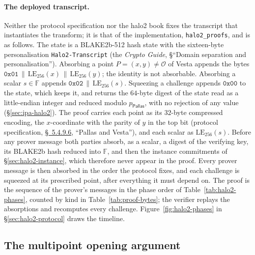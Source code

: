 \documentclass[11pt,a4paper]{article}
\theoremstyle{definition}
\newcommand{\F}{\mathbb{F}}
\newcommand{\Pallas}{\ensuremath{\mathsf{Pallas}}}
\begin{document}
\paragraph{The deployed transcript.}
Neither the protocol specification nor the halo2 book fixes the
transcript that instantiates the transform; it is that of the
implementation, \texttt{halo2\_proofs}, and is as follows. The state is
a BLAKE2b-512 hash state with the sixteen-byte personalisation
\texttt{Halo2-Transcript} (the \emph{Crypto Guide}, \S``Domain
separation and personalisation''). Absorbing a point
$P = (x, y) \ne \mathcal O$ of Vesta appends the bytes
$\mathtt{0x01} \,\|\, \mathrm{LE}_{256}(x) \,\|\, \mathrm{LE}_{256}(y)$;
the identity is not absorbable. Absorbing a scalar $s \in \F$ appends
$\mathtt{0x02} \,\|\, \mathrm{LE}_{256}(s)$. Squeezing a challenge
appends $\mathtt{0x00}$ to the state, which keeps it, and returns the
$64$-byte digest of the state read as a little-endian integer and
reduced modulo $p_{\Pallas}$, with no rejection of any value
(\S\ref{sec:ipa-halo2}). The proof carries each point as its $32$-byte
compressed encoding, the $x$-coordinate with the parity of $y$ in the
top bit (protocol specification,
\href{https://zips.z.cash/protocol/protocol.pdf\#pallasandvesta}{\S~5.4.9.6},
``Pallas and Vesta''), and each scalar as $\mathrm{LE}_{256}(s)$. Before
any prover message both parties absorb, as a scalar, a digest of the
verifying key, its BLAKE2b hash reduced into $\F$, and then the
instance commitments of \S\ref{sec:halo2-instance}, which therefore
never appear in the proof. Every prover message is then
absorbed in the order the protocol fixes, and each challenge is squeezed
at its prescribed point, after everything it must depend on. The proof
is the sequence of the prover's messages in the phase order of
Table~\ref{tab:halo2-phases}, counted by kind in
Table~\ref{tab:proof-bytes}; the verifier replays the absorptions and
recomputes every challenge. Figure~\ref{fig:halo2-phases} in
\S\ref{sec:halo2-protocol} draws the timeline.

\subsection{The multipoint opening argument}
\label{sec:halo2-multipoint}
\end{document}
